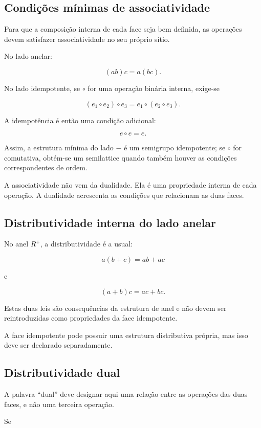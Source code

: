 \documentclass[11pt,a4paper]{article}
\begin{document}
\subsection{Condições mínimas de associatividade}

Para que a composição interna de cada face seja bem definida, as operações
devem satisfazer associatividade no seu próprio sítio.

No lado anelar:

$$
\boxed{
(ab)c=a(bc).
}
$$

No lado idempotente, se \(\circ\) for uma operação binária interna,
exige-se

$$
\boxed{
(e_1\circ e_2)\circ e_3
=
e_1\circ(e_2\circ e_3).
}
$$

A idempotência é então uma condição adicional:

$$
\boxed{
e\circ e=e.
}
$$

Assim, a estrutura mínima do lado \(-\) é um semigrupo idempotente;
se \(\circ\) for comutativa, obtém-se um semilattice quando também houver
as condições correspondentes de ordem.

A associatividade não vem da dualidade. Ela é uma propriedade interna de
cada operação. A dualidade acrescenta as condições que relacionam as duas
faces.

\subsection{Distributividade interna do lado anelar}

No anel \(R^+\), a distributividade é a usual:

$$
\boxed{
a(b+c)=ab+ac
}
$$

e

$$
\boxed{
(a+b)c=ac+bc.
}
$$

Estas duas leis são consequências da estrutura de anel e não devem ser
reintroduzidas como propriedades da face idempotente.

A face idempotente pode possuir uma estrutura distributiva própria, mas
isso deve ser declarado separadamente.

\subsection{Distributividade dual}

A palavra ``dual'' deve designar aqui uma relação entre as operações das
duas faces, e não uma terceira operação.

Se
\end{document}
